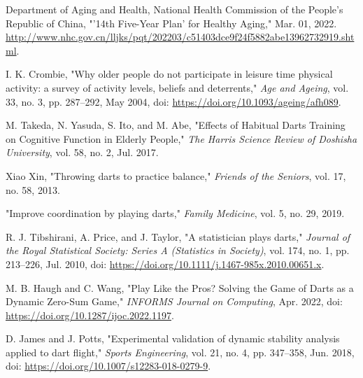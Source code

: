 \documentclass[cjjs]{ipart}
\theoremstyle{plain}
\begin{document}
\begin{thebibliography}{9}

Department of Aging and Health, National Health Commission of the People's Republic of China, "'14th Five-Year Plan' for Healthy Aging," Mar. 01, 2022. \url{http://www.nhc.gov.cn/lljks/pqt/202203/c51403dce9f24f5882abe13962732919.shtml}.

I. K. Crombie, "Why older people do not participate in leisure time physical activity: a survey of activity levels, beliefs and deterrents," \textit{Age and Ageing}, vol. 33, no. 3, pp. 287–292, May 2004, doi: \url{https://doi.org/10.1093/ageing/afh089}.

M. Takeda, N. Yasuda, S. Ito, and M. Abe, "Effects of Habitual Darts Training on Cognitive Function in Elderly People," \textit{The Harris Science Review of Doshisha University}, vol. 58, no. 2, Jul. 2017.

Xiao Xin, "Throwing darts to practice balance," \textit{Friends of the Seniors}, vol. 17, no. 58, 2013.

"Improve coordination by playing darts," \textit{Family Medicine}, vol. 5, no. 29, 2019.

R. J. Tibshirani, A. Price, and J. Taylor, "A statistician plays darts," \textit{Journal of the Royal Statistical Society: Series A (Statistics in Society)}, vol. 174, no. 1, pp. 213–226, Jul. 2010, doi: \url{https://doi.org/10.1111/j.1467-985x.2010.00651.x}.

M. B. Haugh and C. Wang, "Play Like the Pros? Solving the Game of Darts as a Dynamic Zero-Sum Game," \textit{INFORMS Journal on Computing}, Apr. 2022, doi: \url{https://doi.org/10.1287/ijoc.2022.1197}.

D. James and J. Potts, "Experimental validation of dynamic stability analysis applied to dart flight," \textit{Sports Engineering}, vol. 21, no. 4, pp. 347–358, Jun. 2018, doi: \url{https://doi.org/10.1007/s12283-018-0279-9}.

\end{thebibliography}
\end{document}
